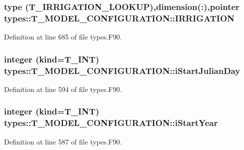 \hypertarget{typetypes_1_1_t___m_o_d_e_l___c_o_n_f_i_g_u_r_a_t_i_o_n_a2d71884498a5e58ab71ca5a28dc4232e}{
\subsubsection[{IRRIGATION}]{\setlength{\rightskip}{0pt plus 5cm}type ({\bf T\_\-IRRIGATION\_\-LOOKUP}),dimension(:),pointer {\bf types::T\_\-MODEL\_\-CONFIGURATION::IRRIGATION}}}
\label{typetypes_1_1_t___m_o_d_e_l___c_o_n_f_i_g_u_r_a_t_i_o_n_a2d71884498a5e58ab71ca5a28dc4232e}


Definition at line 685 of file types.F90.

\hypertarget{typetypes_1_1_t___m_o_d_e_l___c_o_n_f_i_g_u_r_a_t_i_o_n_a5a398843408a58b46073f40a70b375d3}{
\subsubsection[{iStartJulianDay}]{\setlength{\rightskip}{0pt plus 5cm}integer (kind={\bf T\_\-INT}) {\bf types::T\_\-MODEL\_\-CONFIGURATION::iStartJulianDay}}}
\label{typetypes_1_1_t___m_o_d_e_l___c_o_n_f_i_g_u_r_a_t_i_o_n_a5a398843408a58b46073f40a70b375d3}


Definition at line 594 of file types.F90.

\hypertarget{typetypes_1_1_t___m_o_d_e_l___c_o_n_f_i_g_u_r_a_t_i_o_n_a00ba8d8dab6e3bacd575639bc18edc48}{
\subsubsection[{iStartYear}]{\setlength{\rightskip}{0pt plus 5cm}integer (kind={\bf T\_\-INT}) {\bf types::T\_\-MODEL\_\-CONFIGURATION::iStartYear}}}
\label{typetypes_1_1_t___m_o_d_e_l___c_o_n_f_i_g_u_r_a_t_i_o_n_a00ba8d8dab6e3bacd575639bc18edc48}


Definition at line 587 of file types.F90.

